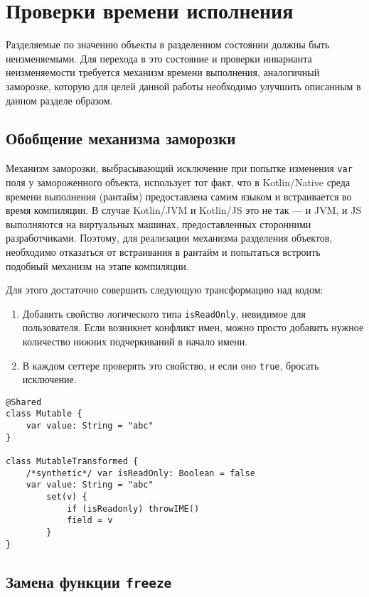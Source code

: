 \documentclass[specification,annotation,times]{itmo-student-thesis}
\begin{document}
\section{Проверки времени исполнения}

Разделяемые по значению объекты в разделенном состоянии должны быть неизменяемыми.
Для перехода в это состояние и проверки инварианта неизменяемости требуется механизм времени выполнения, аналогичный заморозке, которую для целей данной работы необходимо улучшить описанным в данном разделе образом. 

\subsection{Обобщение механизма заморозки}

Механизм заморозки, выбрасывающий исключение при попытке изменения \texttt{var} поля у замороженного объекта, использует тот факт, что в Kotlin/Native среда времени выполнения (рантайм) предоставлена самим языком и встраивается во время компиляции.
В случае Kotlin/JVM и Kotlin/JS это не так –-- и JVM, и JS выполняются на виртуальных машинах, предоставленных сторонними разработчиками.
Поэтому, для реализации механизма разделения объектов, необходимо отказаться от встраивания в рантайм и попытаться встроить подобный механизм на этапе компиляции.

Для этого достаточно совершить следующую трансформацию над кодом: 

\begin{enumerate}
	\item Добавить свойство логического типа \texttt{isReadOnly}, невидимое для пользователя. Если возникнет конфликт имен, можно просто добавить нужное количество нижних подчеркиваний в начало имени.
	\item В каждом сеттере проверять это свойство, и если оно \texttt{true}, бросать исключение.
\end{enumerate}

\begin{lstlisting}[float=h!,caption={Код до и после трансформации}]
@Shared
class Mutable {
	var value: String = "abc"
}

class MutableTransformed {
	/*synthetic*/ var isReadOnly: Boolean = false
	var value: String = "abc"
		set(v) {
			if (isReadonly) throwIME() 
			field = v
		}
}
\end{lstlisting}

\subsection{Замена функции \texttt{freeze}}\label{def_share}
\end{document}
